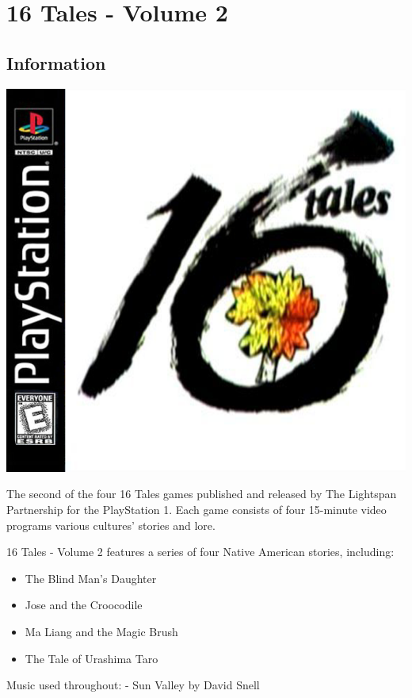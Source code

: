 \chapter{16 Tales - Volume 2}

\section{Information}

\includegraphics[width=\textwidth/2]{"./Games/16Tales/Images/16TalesGeneralLogo.png"}

The second of the four 16 Tales games published and released by The Lightspan Partnership for the PlayStation 1. Each game consists of four 15-minute video programs various cultures' stories and lore.

16 Tales - Volume 2 features a series of four Native American stories, including:
\begin{itemize}
    \item The Blind Man's Daughter
    \item Jose and the Croocodile
    \item Ma Liang and the Magic Brush
    \item The Tale of Urashima Taro
\end{itemize}

Music used throughout:
- Sun Valley by David Snell

